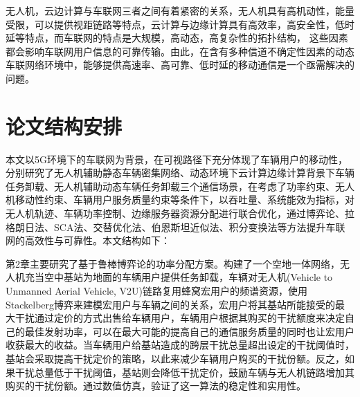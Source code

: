 \textcolor[RGB]{202,12,22}{}
无人机，云边计算与车联网三者之间有着紧密的关系，无人机具有高机动性，能量受限，可以提供视距链路等特点，云计算与边缘计算具有高效率，高安全性，低时延等特点，而车联网的特点是大规模，高动态，高复杂性的拓扑结构，
这些因素都会影响车联网用户信息的可靠传输。由此，在含有多种信道不确定性因素的动态车联网络环境中，能够提供高速率、高可靠、低时延的移动通信是一个亟需解决的问题。

\section{论文结构安排}\label{section1-4}
本文以5G环境下的车联网为背景，在可视路径下充分体现了车辆用户的移动性，分别研究了无人机辅助静态车辆密集网络、动态环境下云计算边缘计算背景下车辆任务卸载、无人机辅助动态车辆任务卸载三个通信场景，在考虑了功率约束、无人机移动性约束、车辆用户服务质量约束等条件下，以吞吐量、系统能效为指标，对无人机轨迹、车辆功率控制、边缘服务器资源分配进行联合优化，通过博弈论、拉格朗日法、SCA法、交替优化法、伯恩斯坦近似法、积分变换法等方法提升车联网的高效性与可靠性。本文结构如下：

第2章主要研究了基于鲁棒博弈论的功率分配方案。构建了一个空地一体网络，无人机充当空中基站为地面的车辆用户提供任务卸载，车辆对无人机(Vehicle to Unmanned Aerial Vehicle, V2U)链路复用蜂窝宏用户的频谱资源，使用Stackelberg博弈来建模宏用户与车辆之间的关系，宏用户将其基站所能接受的最大干扰通过定价的方式出售给车辆用户，车辆用户根据其购买的干扰额度来决定自己的最佳发射功率，可以在最大可能的提高自己的通信服务质量的同时也让宏用户收获最大的收益。当车辆用户给基站造成的跨层干扰总量超出设定的干扰阈值时，基站会采取提高干扰定价的策略，以此来减少车辆用户购买的干扰份额。反之，如果干扰总量低于干扰阈值，基站则会降低干扰定价，鼓励车辆与无人机链路增加其购买的干扰份额。通过数值仿真，验证了这一算法的稳定性和实用性。

